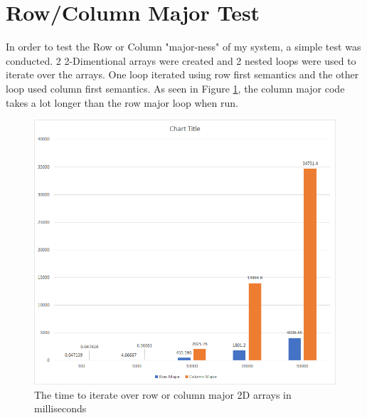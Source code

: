 \documentclass{article}
\begin{document}
	\section{Row/Column Major Test}
		In order to test the Row or Column "major-ness" of my system, a simple test was conducted. 2 2-Dimentional arrays were created and 2 nested loops were used to iterate over the arrays. One loop iterated using row first semantics and the other loop used column first semantics. As seen in Figure \ref{rc:res_graph}, the column major code takes a lot longer than the row major loop when run.
		\begin{figure}[H]
			\label{rc:res_graph}
			\centering
			\includegraphics[width=\textwidth]{res_graph.png}
			\caption{The time to iterate over row or column major 2D arrays in milliseconds}
		\end{figure}
\end{document}
